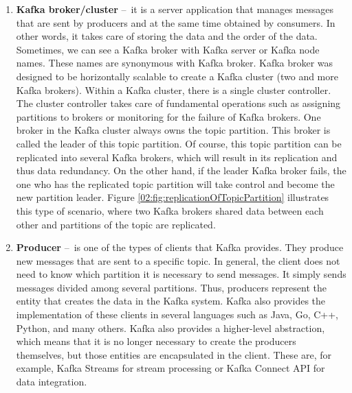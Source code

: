 \begin{enumerate}
    \item \textbf{Kafka broker/cluster} \---\ it is a server application that manages messages that are sent by producers and at the same time obtained by consumers.
    In other words, it takes care of storing the data and the order of the data.
    Sometimes, we can see a Kafka broker with Kafka server or Kafka node names.
    These names are synonymous with Kafka broker.
    Kafka broker was designed to be horizontally scalable to create a Kafka cluster (two and more Kafka brokers).
    Within a Kafka cluster, there is a single cluster controller.
    The cluster controller takes care of fundamental operations such as assigning partitions to brokers or monitoring for the failure of Kafka brokers.
    One broker in the Kafka cluster always owns the topic partition.
    This broker is called the leader of this topic partition.
    Of course, this topic partition can be replicated into several Kafka brokers, which will result in its replication and thus data redundancy.
    On the other hand, if the leader Kafka broker fails, the one who has the replicated topic partition will take control and become the new partition leader.
    Figure \ref{02:fig:replicationOfTopicPartition} illustrates this type of scenario, where two Kafka brokers shared data between each other and partitions of the topic are replicated.

    \item \textbf{Producer} \---\ is one of the types of clients that Kafka provides.
    They produce new messages that are sent to a specific topic.
    In general, the client does not need to know which partition it is necessary to send messages.
    It simply sends messages divided among several partitions.
    Thus, producers represent the entity that creates the data in the Kafka system.
    Kafka also provides the implementation of these clients in several languages such as Java, Go, C++, Python, and many others.
    Kafka also provides a higher-level abstraction, which means that it is no longer necessary to create the producers themselves, but those entities are encapsulated in the client.
    These are, for example, Kafka Streams for stream processing or Kafka Connect API for data integration.


\end{enumerate}
